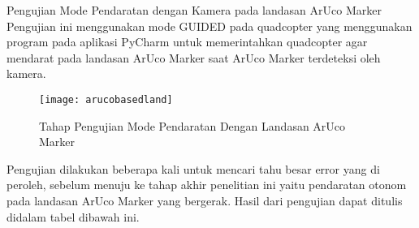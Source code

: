 \begin{packed_enum}
	\item Pengujian Mode Pendaratan dengan Kamera pada landasan ArUco Marker
	\\Pengujian ini menggunakan mode GUIDED pada quadcopter yang menggunakan program pada aplikasi PyCharm untuk memerintahkan quadcopter agar mendarat pada landasan ArUco Marker saat ArUco Marker terdeteksi oleh kamera. 
	
	\begin{figure}[H]
		\centering
		\texttt{[image: arucobasedland]}
		\caption{Tahap Pengujian Mode Pendaratan Dengan Landasan ArUco Marker}
		\label{fig:arucobasedland}
	\end{figure}
	
	Pengujian dilakukan beberapa kali untuk mencari tahu besar error yang di peroleh, sebelum menuju ke tahap akhir penelitian ini yaitu pendaratan otonom pada landasan ArUco Marker yang bergerak. Hasil dari pengujian dapat ditulis didalam tabel dibawah ini.
	

\end{packed_enum}
